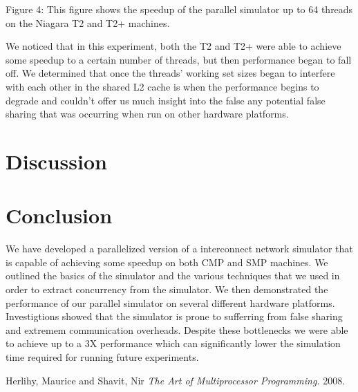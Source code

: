 \documentclass{article}
\begin{document}
\begin{multicols}{2}
\begin{center}
\small{Figure 4: This figure shows the speedup of the parallel simulator
up to 64 threads on the Niagara T2 and T2+ machines.}
\end{center}
We noticed that in this experiment, both the T2 and T2+ were able to
achieve some speedup to a certain number of threads, but then performance
began to fall off.  We determined that once the threads' working set sizes
began to interfere with each other in the shared L2 cache is when the
performance begins to degrade and couldn't offer us much insight into the
false any potential false sharing that was occurring when run on other
hardware platforms.

\section{Discussion \label{disc}}

\section{Conclusion \label{conc}}
We have developed a parallelized version of a interconnect network
simulator that is capable of achieving some speedup on both CMP and SMP
machines.  We outlined the basics of the simulator and the various
techniques that we used in order to extract concurrency from the
simulator.  We then demonstrated the performance of our parallel simulator
on several different hardware platforms.  Investigtions showed that the
simulator is prone to sufferring from false sharing and extremem
communication overheads.  Despite these bottlenecks we were able to
achieve up to a 3X performance which can significantly lower the
simulation time required for running future experiments.

\begin{thebibliography}{99}
 Herlihy, Maurice and Shavit, Nir {\em The Art of Multiprocessor Programming.} 2008.


\end{thebibliography}
\end{multicols}
\end{document}
